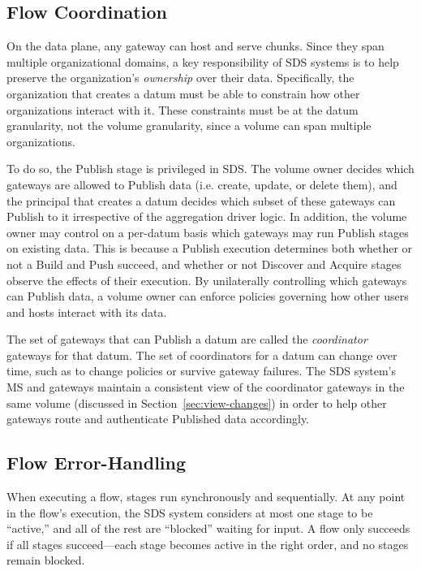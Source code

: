 \subsection{Flow Coordination}

On the data plane, any gateway can host and serve chunks.
Since they span multiple organizational domains, a key responsibility of SDS systems
is to help preserve the organization's \emph{ownership} over their data.
Specifically, the organization that creates a datum
must be able to constrain how other organizations interact with it.  These
constraints must be at the datum granularity, not the volume granularity, since
a volume can span multiple organizations.

To do so, the Publish stage is privileged in SDS.  The volume owner decides
which gateways are allowed to Publish data (i.e. create, update, or delete
them), and the principal that creates a
datum decides which subset of these gateways can Publish to it irrespective of
the aggregation driver logic.  In addition, the volume owner may control on a
per-datum basis which gateways may run Publish stages on existing data.
This is because a Publish
execution determines both whether or not a Build and Push succeed, and
whether or not Discover and Acquire stages observe the effects of their
execution.  By unilaterally controlling which gateways can Publish data,
a volume owner can enforce policies governing how other
users and hosts interact with its data.

The set of gateways that can Publish a datum are called the \emph{coordinator}
gateways for that datum.
The set of coordinators for a datum can change over time, such as to change
policies or survive gateway failures.  The SDS system's MS and gateways
maintain a consistent view of the coordinator gateways in the same volume
(discussed in Section~\ref{sec:view-changes}) in order to help other gateways
route and authenticate Published data accordingly.

\subsection{Flow Error-Handling}

When executing a flow, stages run synchronously and sequentially.  At any point in the flow's execution, the
SDS system considers at most one stage to be ``active,'' and all of the rest are
``blocked'' waiting for input.  A flow only succeeds if all stages
succeed---each stage becomes active in the right order, and no stages remain
blocked.

